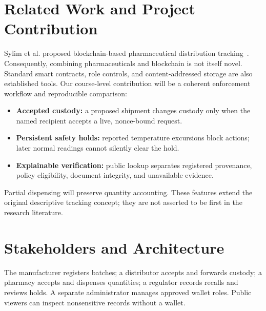\documentclass[10pt,twocolumn,letterpaper]{article}
\begin{document}
\section{Related Work and Project Contribution}
Sylim et al. proposed blockchain-based pharmaceutical distribution tracking~\cite{sylim}. Consequently, combining pharmaceuticals and blockchain is not itself novel. Standard smart contracts, role controls, and content-addressed storage are also established tools. Our course-level contribution will be a coherent enforcement workflow and reproducible comparison:
\begin{itemize}
\item \textbf{Accepted custody:} a proposed shipment changes custody only when the named recipient accepts a live, nonce-bound request.
\item \textbf{Persistent safety holds:} reported temperature excursions block actions; later normal readings cannot silently clear the hold.
\item \textbf{Explainable verification:} public lookup separates registered provenance, policy eligibility, document integrity, and unavailable evidence.
\end{itemize}
Partial dispensing will preserve quantity accounting. These features extend the original descriptive tracking concept; they are not asserted to be first in the research literature.

\section{Stakeholders and Architecture}
The manufacturer registers batches; a distributor accepts and forwards custody; a pharmacy accepts and dispenses quantities; a regulator records recalls and reviews holds. A separate administrator manages approved wallet roles. Public viewers can inspect nonsensitive records without a wallet.

\begin{center}
\end{center}
\end{document}
